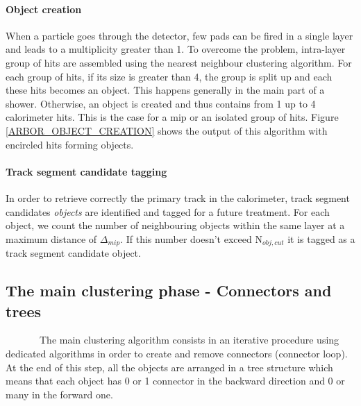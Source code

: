 \documentclass[cits]{JINST}
\begin{document}
\paragraph*{Object creation} When a particle goes through the detector, few pads can be fired in a single layer and leads to a multiplicity greater than 1. To overcome the problem, intra-layer group of hits are assembled using the nearest neighbour clustering algorithm. For each group of hits, if its size is greater than 4, the group is split up and each these hits becomes an object. This happens generally in the main part of a shower. Otherwise, an object is created and thus contains from 1 up to 4 calorimeter hits. This is the case for a mip or an isolated group of hits. Figure \ref{ARBOR_OBJECT_CREATION} shows the output of this algorithm with encircled hits forming objects.

\paragraph*{Track segment candidate tagging}
In order to retrieve correctly the primary track in the calorimeter, track segment candidates \textit{objects} are identified and tagged for a future treatment.
For each object, we count the number of neighbouring objects within the same layer at a maximum distance of $\Delta_{mip}$. If this number doesn't exceed N$_{obj,cut}$ it is tagged as a track segment candidate object.

\subsection{The main clustering phase - Connectors and trees}

~~~~~~~The main clustering algorithm consists in an iterative procedure using dedicated algorithms in order to create and remove connectors (connector loop). At the end of this step, all the objects are arranged in a tree structure which means that each object has 0 or 1 connector in the backward direction and 0 or many in the forward one.
\end{document}
